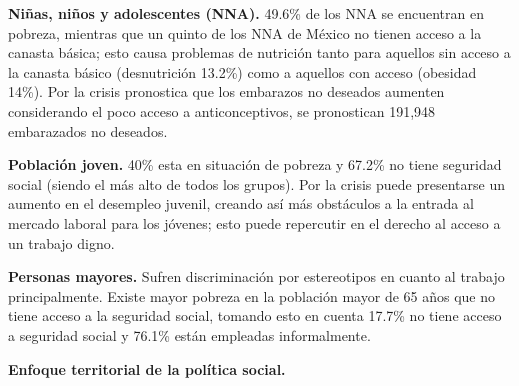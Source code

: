 \textbf{Niñas, niños y adolescentes (NNA).} 49.6\% de los NNA se encuentran en pobreza, mientras que un quinto de los NNA de México no tienen acceso a la canasta básica; esto causa problemas de nutrición tanto para aquellos sin acceso a la canasta básico (desnutrición 13.2\%) como a aquellos con acceso (obesidad 14\%). Por la crisis pronostica que los embarazos no deseados aumenten considerando el poco acceso a anticonceptivos, se pronostican 191,948 embarazados no deseados.

\textbf{Población joven.} 40\% esta en situación de pobreza y 67.2\% no tiene seguridad social (siendo el más alto de todos los grupos). Por la crisis puede presentarse un aumento en el desempleo juvenil, creando así más obstáculos a la entrada al mercado laboral para los jóvenes; esto puede repercutir en el derecho al acceso a un trabajo digno.

\textbf{Personas mayores.} Sufren discriminación por estereotipos en cuanto al trabajo principalmente. Existe mayor pobreza en la población mayor de 65 años que no tiene acceso a la seguridad social, tomando esto en cuenta 17.7\% no tiene acceso a seguridad social y 76.1\% están empleadas informalmente.

\textbf{Enfoque territorial de la política social.}

